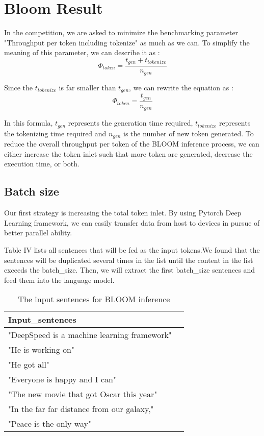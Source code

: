 \pgfplotsset{compat=1.17}

\section{Bloom Result}
\label{sec:conc}
In the competition, we are asked to minimize the benchmarking parameter "Throughput per token including tokenize" as much as we can. To simplify the meaning of this parameter, we can describe it as : \\
\[\Phi_{token} = \frac{t_{gen} + t_{tokenize}}{n_{gen}}\]

Since the \(t_{tokenize}\) is far smaller than \(t_{gen}\), we can rewrite the equation as : \\
\[\Phi_{token} = \frac{t_{gen}}{n_{gen}}\]

In this formula, \(t_{gen}\) represents the generation time required, \(t_{tokenize}\) represents the tokenizing time required and \(n_{gen}\) is the number of new token generated. To reduce the overall throughput per token of the BLOOM inference process, we can either increase the token inlet such that more token are generated, decrease the execution time, or both.

\subsection{Batch size}
Our first strategy is increasing the total token inlet. By using Pytorch Deep Learning framework, we can easily transfer data from host to devices in pursue of better parallel ability.

Table IV lists all sentences that will be fed as the input tokens.We found that the sentences will be duplicated several times in the list until the content in the list exceeds the batch\_size. Then, we will extract the first batch\_size sentences and feed them into the language model.

\begin{table}[ht]
    \centering
    \caption{The input sentences for BLOOM inference}
    \begin{tabular}{ll}
        \toprule
        Input\_sentences  \\
        \midrule
        "DeepSpeed is a machine learning framework" \\
        "He is working on" \\
        "He got all" \\
        "Everyone is happy and I can" \\
        "The new movie that got Oscar this year" \\
        "In the far far distance from our galaxy," \\
        "Peace is the only way" \\
        \bottomrule
    \end{tabular}
    \label{table:software-GPU}
\end{table}

